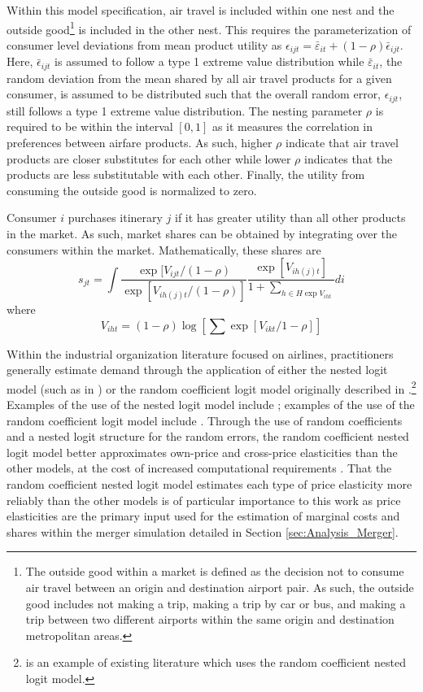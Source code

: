 \documentclass{article}
\begin{document}
    Within this model specification, air travel is included within one nest and the outside good\footnote{The outside good within a market is defined as the decision not to consume air travel between an origin and destination airport pair. As such, the outside good includes not making a trip, making a trip by car or bus, and making a trip between two different airports within the same origin and destination metropolitan areas.} is included in the other nest. This requires the parameterization of consumer level deviations from mean product utility as $\epsilon_{ijt} = \bar{\varepsilon}_{it} + (1-\rho) \bar{\epsilon}_{ijt}$. Here, $\bar{\epsilon}_{ijt}$ is assumed to follow a type 1 extreme value distribution while $\bar{\varepsilon}_{it}$,  the random deviation from the mean shared by all air travel products for a given consumer, is assumed to be distributed such that the overall random error, $\epsilon_{ijt}$, still follows a type 1 extreme value distribution. The nesting parameter $\rho$ is required to be within the interval $[0,1]$ as it measures the correlation in preferences between airfare products. As such, higher $\rho$ indicate that air travel products are closer substitutes for each other while lower $\rho$ indicates that the products are less substitutable with each other. Finally, the utility from consuming the outside good is normalized to zero. 
	
	Consumer $i$ purchases itinerary $j$ if it has greater utility than all other products in the market. As such, market shares can be obtained by integrating over the consumers within the market. Mathematically, these shares are \[s_{jt} = \int \frac{\exp[V_{ijt} / (1-\rho)}{\exp [V_{i h(j) t} / (1 - \rho)]} \frac{\exp[V_{ih(j)t}]}{1 + \sum_{h \in H \exp V_{iht}}} d{{i}}\] where \[V_{iht} = (1 - \rho) \log\left[\sum \exp[V_{ikt} / 1 - \rho]\right] \] 

    Within the industrial organization literature focused on airlines, practitioners generally estimate demand through the application of either the nested logit model (such as in \citet{turner_access_2022,ciliberto_market_2021, aguirregabiria_dynamic_2012}) or the random coefficient logit model originally described in \citet{berry_automobile_1995}.\footnote{\citet{bet_market_2021} is an example of existing literature which uses the random coefficient nested logit model.} Examples of the use of the nested logit model include   \citet{turner_access_2022,ciliberto_market_2021, aguirregabiria_dynamic_2012}; examples of the use of the random coefficient logit model include \citet{ gayle_efficiency_2013, berry_tracing_2010}. Through the use of random coefficients and a nested logit structure for the random errors, the random coefficient nested logit model better approximates own-price and cross-price elasticities than the other models, at the cost of increased computational requirements \citep{grigolon_nested_2014}. That the random coefficient nested logit model estimates each type of price elasticity more reliably than the other models is of particular importance to this work as price elasticities are the primary input used for the estimation of marginal costs and shares within the merger simulation detailed in Section \ref{sec:Analysis_Merger}. 
	
\end{document}
